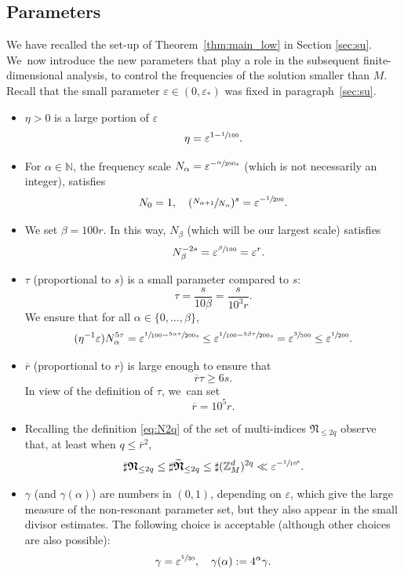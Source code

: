 \documentclass[10pt,a4paper]{amsart}
\theoremstyle{plain}
\theoremstyle{definition}
\newcommand{\Nb}{{\boldsymbol{\mathfrak{N}}}}
\newcommand{\N}{\mathbb{N}}
\newcommand{\Z}{\mathbb{Z}}
\newcommand{\1}{\mathbf{1}}
\let\epsilon\varepsilon
\begin{document}
\subsection{Parameters}
\label{sec:par}
We have recalled the set-up of Theorem~\ref{thm:main_low} in Section \ref{sec:su}. We~now introduce the new parameters that play a role in the subsequent finite-dimensional analysis, to control the frequencies of the solution smaller than $M$. Recall that the small parameter $\epsilon\in(0,\epsilon_{\ast})$ was fixed in paragraph~\eqref{sec:su}.
\begin{itemize}
\item $\eta>0$ is a large portion of $\epsilon$
\[
\eta = \epsilon^{1-\sfrac{1}{100}}.
\]
\item For $\alpha\in\N$, the frequency scale $N_{\alpha}=\epsilon^{-\sfrac{\alpha}{200s}}$ (which is not necessarily an integer), satisfies
\[
N_{0}=1,\quad (\sfrac{N_{\alpha+1}}{N_{\alpha}})^{s} = \epsilon^{-\sfrac{1}{200}}.
\]
\item We set $\beta = 100r$. In this way, $N_{\beta}$ (which will be our largest scale) satisfies
\begin{equation}
\label{eq:s-beta}
\quad N_{\beta}^{-2s} = \epsilon^{\sfrac{\beta}{100}} = \epsilon^{r}.
\end{equation}
\item $\tau$ (proportional to $s$) is a small parameter compared to $s$:
\[
\tau = \frac{s}{10\beta} = \frac{s}{10^{3}r}.
\]
We ensure that for all $\alpha\in\{0,\dots,\beta\}$,
\begin{equation}
\label{eq:eta-tau}
(\eta^{-1}\epsilon) N_{\alpha}^{5\tau} = \epsilon^{\sfrac{1}{100}-\sfrac{5\alpha\tau}{200s}} \leq \epsilon^{\sfrac{1}{100}-\sfrac{5\beta \tau}{200s}} = \epsilon^{\sfrac{3}{500}}\leq \epsilon^{\sfrac{1}{200}}.
\end{equation}
\item $\overline{r}$ (proportional to $r$) is large enough to ensure that
\begin{equation}
\label{eq:r-bar}
\overline{r}\tau \geq 6s.
\end{equation}
In view of the definition of $\tau$, we~can set
\[
\overline{r}=10^{5}r.
\]
\item Recalling the definition \eqref{eq:N2q} of the set of multi-indices $\Nb_{\leq2q}$ observe that, at least when $q\leq\overline{r}^{2}$,
\begin{equation}
\label{eq:counting}
\sharp\Nb_{\leq2q}\leq \sharp\widetilde{\Nb}_{\leq 2q}\leq \sharp(\Z_{M}^{d})^{2q}\ll \epsilon^{-\sfrac{1}{10^{6}}}.
\end{equation}
\item $\gamma$ (and $\gamma(\alpha)$) are numbers in $(0,1)$, depending on $\epsilon$, which give the large measure of the non-resonant parameter set, but they also appear in the small divisor estimates. The following choice is acceptable (although other choices are also possible):
\begin{equation}
\label{eq:gamma}
\gamma = \epsilon^{\sfrac{1}{30}},\quad \gamma(\alpha) :=4^{\alpha}\gamma.
\end{equation}
\end{itemize}
\end{document}
